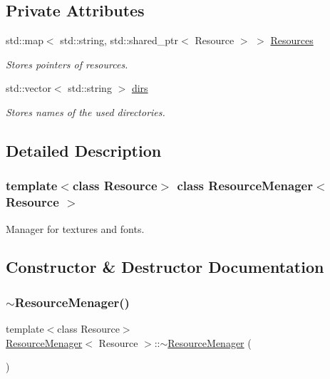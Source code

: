 \subsection*{Private Attributes}
\begin{DoxyCompactItemize}
\item 
std\+::map$<$ std\+::string, std\+::shared\+\_\+ptr$<$ Resource $>$ $>$ \mbox{\hyperlink{class_resource_menager_a2ec0eb338dd837126c8ba0b53b0ddbc5}{Resources}}
\begin{DoxyCompactList}\small\item\em Stores pointers of resources. \end{DoxyCompactList}\item 
std\+::vector$<$ std\+::string $>$ \mbox{\hyperlink{class_resource_menager_a0dc38a54fb434107185e954ed6f60c2e}{dirs}}
\begin{DoxyCompactList}\small\item\em Stores names of the used directories. \end{DoxyCompactList}\end{DoxyCompactItemize}


\subsection{Detailed Description}
\subsubsection*{template$<$class Resource$>$\newline
class Resource\+Menager$<$ Resource $>$}

Manager for textures and fonts. 

\subsection{Constructor \& Destructor Documentation}
\mbox{\label{class_resource_menager_af686b0f4b7f7167c88cac3586f4599c9}} 
\subsubsection{\texorpdfstring{$\sim$ResourceMenager()}{~ResourceMenager()}}
{\footnotesize\ttfamily template$<$class Resource$>$ \\
\mbox{\hyperlink{class_resource_menager}{Resource\+Menager}}$<$ Resource $>$\+::$\sim$\mbox{\hyperlink{class_resource_menager}{Resource\+Menager}} (\begin{DoxyParamCaption}{ }\end{DoxyParamCaption})}



